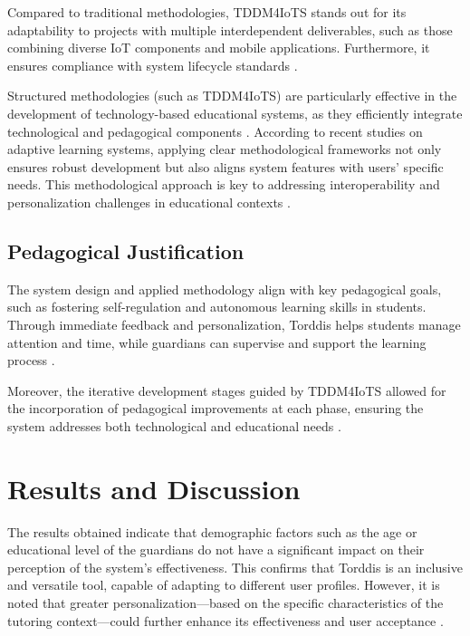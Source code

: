                 Compared to traditional methodologies, TDDM4IoTS stands out for its adaptability to projects with multiple interdependent deliverables, such as those combining diverse IoT components and mobile applications. Furthermore, it ensures compliance with system lifecycle standards \citep{Guerrero2023Agile,ISO-IEC-IEEE12207-2017,ISO-IEC-IEEE12207-2017Application}.
                
                Structured methodologies (such as TDDM4IoTS) are particularly effective in the development of technology-based educational systems, as they efficiently integrate technological and pedagogical components \citep{Borte2024Learning,Kirkwood2014Technology}. According to recent studies on adaptive learning systems, applying clear methodological frameworks not only ensures robust development but also aligns system features with users’ specific needs. This methodological approach is key to addressing interoperability and personalization challenges in educational contexts \citep{Wang2025Development}.
                
                \subsection{Pedagogical Justification}
                The system design and applied methodology align with key pedagogical goals, such as fostering self-regulation and autonomous learning skills in students. Through immediate feedback and personalization, Torddis helps students manage attention and time, while guardians can supervise and support the learning process \citep{Chen2025Unpacking}.
                
                Moreover, the iterative development stages guided by TDDM4IoTS allowed for the incorporation of pedagogical improvements at each phase, ensuring the system addresses both technological and educational needs \citep{Huang2025How}.
                
                \section{Results and Discussion}
                \label{section:sixth}
                The results obtained indicate that demographic factors such as the age or educational level of the guardians do not have a significant impact on their perception of the system’s effectiveness. This confirms that Torddis is an inclusive and versatile tool, capable of adapting to different user profiles. However, it is noted that greater personalization—based on the specific characteristics of the tutoring context—could further enhance its effectiveness and user acceptance \citep{Conati2021Toward}.
                
